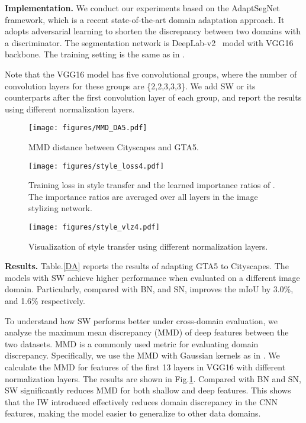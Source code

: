 \documentclass[10pt,twocolumn,letterpaper]{article}
\begin{document}
\noindent\textbf{Implementation.} 
We conduct our experiments based on the AdaptSegNet~\cite{tsai2018learning} framework, which is a recent state-of-the-art domain adaptation approach.
It adopts adversarial learning to shorten the discrepancy between two domains with a discriminator.
The segmentation network is DeepLab-v2~\cite{chen2018deeplab} model with VGG16~\cite{simonyan2014very} backbone.
The training setting is the same as in \cite{tsai2018learning}.

Note that the VGG16 model has five convolutional groups, where the number of convolution layers for these groups are \{2,2,3,3,3\}.
We add SW or its counterparts after the first convolution layer of each group, and report the results using different normalization layers.

\begin{figure}[t!]
	\centering
	\texttt{[image: figures/MMD\_DA5.pdf]}
	\caption{MMD distance between Cityscapes and GTA5.}
	\label{MMD}
	\vspace{-10pt}
\end{figure}

\begin{figure*}[t!]
	\centering
	\texttt{[image: figures/style\_loss4.pdf]}
	\caption{Training loss in style transfer and the learned importance ratios of . The importance ratios are averaged over all  layers in the image stylizing network. }
	\label{style_loss}
	\vspace{-12pt}
\end{figure*}

\begin{figure}[t!]
	\centering
	\texttt{[image: figures/style\_vlz4.pdf]}
	\vspace{-5pt}
	\caption{Visualization of style transfer using different normalization layers.}
	\label{visualize}
	\vspace{-10pt}
\end{figure}

\noindent\textbf{Results.} 
Table.\ref{DA} reports the results of adapting GTA5 to Cityscapes.
The models with SW achieve higher performance when evaluated on a different image domain.
Particularly, compared with BN, and SN,  improves the mIoU by 3.0\%, and 1.6\% respectively.

To understand how SW performs better under cross-domain evaluation, we analyze the maximum mean discrepancy (MMD)\cite{gretton2012kernel} of deep features between the two datasets.
MMD is a commonly used metric for evaluating domain discrepancy.
Specifically, we use the MMD with Gaussian kernels as in \cite{li2017mmd}.
We calculate the MMD for features of the first 13 layers in VGG16 with different normalization layers.
The results are shown in Fig.\ref{MMD}.
Compared with BN and SN, SW significantly reduces MMD for both shallow and deep features.
This shows that the IW introduced effectively reduces domain discrepancy in the CNN features, making the model easier to generalize to other data domains.
\end{document}
